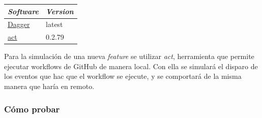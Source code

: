 \begin{table}
  \centering
  \begin{tabular}{|l|l|}
    \hline
    \textit{Software} & \textit{Version} \\ \hline
    \href{https://docs.dagger.io/install/}{Dagger} & latest \\ \hline
    \href{https://nektosact.com/installation/index.html}{act} & 0.2.79 \\ \hline
  \end{tabular}
\end{table}

Para la simulación de una nueva \textit{feature} se utilizar \textit{act}, herramienta que permite ejecutar workflows de GitHub de manera local. Con ella se simulará el disparo de los eventos que hac que el workflow se ejecute, y se comportará de la misma manera que haría en remoto.

\subsubsection*{Cómo probar}

